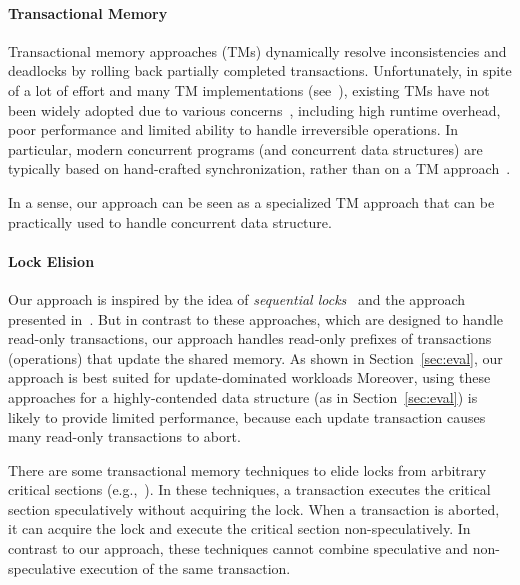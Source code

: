 \paragraph{Transactional Memory}
Transactional memory approaches (TMs) dynamically resolve inconsistencies
and deadlocks by rolling back partially completed transactions.
%
Unfortunately, in spite of a lot of effort and many TM implementations (see~\cite{HLR:SLCA2010}), existing TMs
have not been widely adopted due to various concerns~\cite{DuffyTM2010,Cascaval:2008,mckenneyParallel}, including high runtime overhead,
poor performance and limited ability to handle irreversible operations.
In particular, modern concurrent programs (and concurrent data structures) are typically based on hand-crafted synchronization, rather than  on a TM approach~\cite{Ohad:OOPSLA11}.

In a sense, our approach can be seen as a specialized TM approach that can be practically used to handle concurrent data structure.


\paragraph{Lock Elision}
Our approach is inspired by the idea of \emph{sequential locks}~\cite{mckenneyParallel} and the approach presented in~\cite{Nakaike:2010}.
But  in contrast to these approaches,  which are designed to handle read-only transactions,
our approach handles read-only prefixes of transactions (operations) that update the shared memory.
As shown in Section~\ref{sec:eval}, our approach is best suited for update-dominated workloads
Moreover, using these approaches for a highly-contended data structure (as in Section~\ref{sec:eval}) is likely to provide limited performance,
because each update transaction causes many read-only transactions to abort.

There are some transactional memory techniques to elide locks from arbitrary critical sections (e.g.,~\cite{Rajwar:2002:TLE:635508.605399,Roy:2009:RSS:1519065.1519094,Afek:2014:SHL:2611462.2611482}).
In these techniques, a transaction executes the critical section speculatively without acquiring the lock.
When a transaction is aborted, it can acquire the lock and execute the critical section non-speculatively.
In contrast to our approach, these techniques cannot combine speculative and non-speculative execution of the same transaction.







